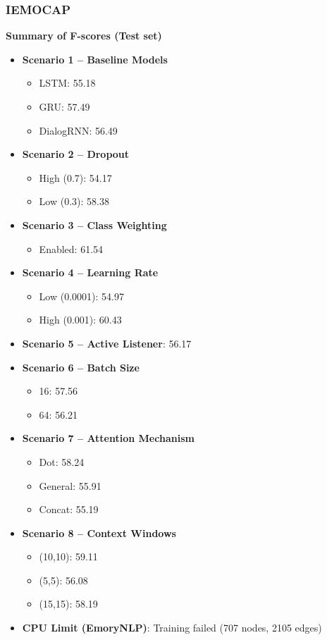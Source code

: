 \documentclass[a4paper,11pt]{article}
\begin{document}
\subsubsection{IEMOCAP}
\textbf{Summary of F-scores (Test set)}
\begin{itemize}
  \item \textbf{Scenario 1 – Baseline Models}
    \begin{itemize}
      \item LSTM: 55.18  
      \item GRU: 57.49  
      \item DialogRNN: 56.49  
    \end{itemize}
  \item \textbf{Scenario 2 – Dropout}
    \begin{itemize}
      \item High (0.7): 54.17  
      \item Low  (0.3): 58.38  
    \end{itemize}
  \item \textbf{Scenario 3 – Class Weighting}
    \begin{itemize}
      \item Enabled: 61.54  
    \end{itemize}
  \item \textbf{Scenario 4 – Learning Rate}
    \begin{itemize}
      \item Low  (0.0001): 54.97  
      \item High (0.001): 60.43  
    \end{itemize}
  \item \textbf{Scenario 5 – Active Listener}: 56.17  
  \item \textbf{Scenario 6 – Batch Size}
    \begin{itemize}
      \item 16: 57.56  
      \item 64: 56.21  
    \end{itemize}
  \item \textbf{Scenario 7 – Attention Mechanism}
    \begin{itemize}
      \item Dot:     58.24  
      \item General: 55.91  
      \item Concat:  55.19  
    \end{itemize}
  \item \textbf{Scenario 8 – Context Windows}
    \begin{itemize}
      \item (10,10): 59.11  
      \item (5,5):   56.08  
      \item (15,15): 58.19  
    \end{itemize}
  \item \textbf{CPU Limit (EmoryNLP)}: Training failed (707 nodes, 2105 edges)
\end{itemize}
\end{document}
